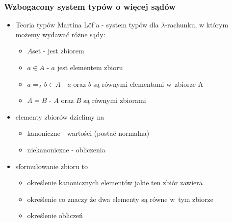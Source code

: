 \documentclass{beamer}
\begin{document}
\begin{frame}
\frametitle{Wzbogacony system typów o więcej sądów}

\begin{itemize}
 \item Teoria typów Martina L\"{o}f'a - system typów dla $\lambda$-rachunku, w którym możemy wydawać różne sądy:
       
\begin{itemize}
 \item $A$\;set -  jest zbiorem
 \item $a \in A$ - $a$ jest elementem zbioru
 \item $a =_A b \in A$ - $a$ oraz $b$ są równymi elementami w~zbiorze A
 \item $A = B$ - $A$ oraz $B$ są równymi zbiorami
\end{itemize}

\item elementy zbiorów dzielimy na
\begin{itemize}
 \item kanoniczne - wartości (postać normalna)
 \item niekanoniczne - obliczenia 
\end{itemize}


\item sformułowanie zbioru to
\begin{itemize}
 \item określenie kanonicznych elementów jakie ten zbiór zawiera
 \item określenie co znaczy że dwa elementy są równe w~tym zbiorze
 \item określenie obliczeń
\end{itemize}

\end{itemize}

\end{frame}

\end{document}
